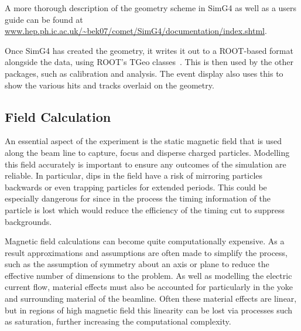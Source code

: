 A more thorough description of the geometry scheme  in SimG4 as well as a users guide can be found at \url{www.hep.ph.ic.ac.uk/~bek07/comet/SimG4/documentation/index.shtml}.

Once SimG4 has created the geometry, it writes it out to a ROOT-based format alongside the data, using ROOT's TGeo classes~\cite{ROOTTGeo}.
This is then used by the other packages, such as calibration and analysis.  
The event display also uses this to show the various hits and tracks overlaid on the geometry.

\subsection{Field Calculation}

An essential aspect of the \COMET experiment is the static magnetic field that is used along the beam line to capture, focus and disperse charged particles.
Modelling this field accurately is important to ensure any outcomes of the simulation are reliable.
In particular, dips in the field have a risk of mirroring particles backwards or even trapping particles for extended periods.
This could be especially dangerous for \COMET since in the process the timing information of the particle is lost which would reduce the efficiency of the timing cut to suppress backgrounds.

Magnetic field calculations can become quite computationally expensive.  
As a result approximations and assumptions are often made to simplify the process, such as the assumption of symmetry about an axis or plane to reduce the effective number of dimensions to the problem.
As well as modelling the electric current flow, material effects must also be accounted for particularly in the yoke and surrounding material of the beamline.
Often these material effects are linear, but in regions of high magnetic field this linearity can be lost via processes such as saturation, further increasing the computational complexity.

